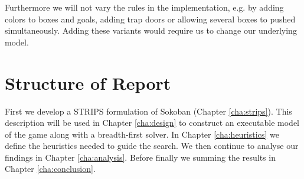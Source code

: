 Furthermore we will not vary the rules in the implementation, e.g. by
adding colors to boxes and goals, adding trap doors or allowing
several boxes to pushed simultaneously. Adding these variants would
require us to change our underlying model.

\section{Structure of Report}


First we develop a STRIPS formulation of Sokoban (Chapter
\ref{cha:strips}). This description will be used in Chapter
\ref{cha:design} to construct an executable model of the game along
with a breadth-first solver. In Chapter \ref{cha:heuristics} we define
the heuristics needed to guide the search. We then continue to analyse
our findings in Chapter \ref{cha:analysis}. Before finally we summing
the results in Chapter \ref{cha:conclusion}.


